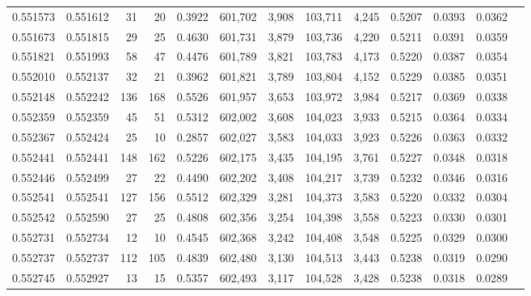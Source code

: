 \begin{tabular}{rrrrrrrrrrrrr}
0.551573 & 0.551612 &    31 &    20 &                                     0.3922 & 601,702 &   3,908 & 103,711 &   4,245 & 0.5207 & 0.0393 & 0.0362 \\
0.551673 & 0.551815 &    29 &    25 &                                     0.4630 & 601,731 &   3,879 & 103,736 &   4,220 & 0.5211 & 0.0391 & 0.0359 \\
0.551821 & 0.551993 &    58 &    47 &                                     0.4476 & 601,789 &   3,821 & 103,783 &   4,173 & 0.5220 & 0.0387 & 0.0354 \\
0.552010 & 0.552137 &    32 &    21 &                                     0.3962 & 601,821 &   3,789 & 103,804 &   4,152 & 0.5229 & 0.0385 & 0.0351 \\
0.552148 & 0.552242 &   136 &   168 &                                     0.5526 & 601,957 &   3,653 & 103,972 &   3,984 & 0.5217 & 0.0369 & 0.0338 \\
0.552359 & 0.552359 &    45 &    51 &                                     0.5312 & 602,002 &   3,608 & 104,023 &   3,933 & 0.5215 & 0.0364 & 0.0334 \\
0.552367 & 0.552424 &    25 &    10 &                                     0.2857 & 602,027 &   3,583 & 104,033 &   3,923 & 0.5226 & 0.0363 & 0.0332 \\
0.552441 & 0.552441 &   148 &   162 &                                     0.5226 & 602,175 &   3,435 & 104,195 &   3,761 & 0.5227 & 0.0348 & 0.0318 \\
0.552446 & 0.552499 &    27 &    22 &                                     0.4490 & 602,202 &   3,408 & 104,217 &   3,739 & 0.5232 & 0.0346 & 0.0316 \\
0.552541 & 0.552541 &   127 &   156 &                                     0.5512 & 602,329 &   3,281 & 104,373 &   3,583 & 0.5220 & 0.0332 & 0.0304 \\
0.552542 & 0.552590 &    27 &    25 &                                     0.4808 & 602,356 &   3,254 & 104,398 &   3,558 & 0.5223 & 0.0330 & 0.0301 \\
0.552731 & 0.552734 &    12 &    10 &                                     0.4545 & 602,368 &   3,242 & 104,408 &   3,548 & 0.5225 & 0.0329 & 0.0300 \\
0.552737 & 0.552737 &   112 &   105 &                                     0.4839 & 602,480 &   3,130 & 104,513 &   3,443 & 0.5238 & 0.0319 & 0.0290 \\
0.552745 & 0.552927 &    13 &    15 &                                     0.5357 & 602,493 &   3,117 & 104,528 &   3,428 & 0.5238 & 0.0318 & 0.0289 \\

\end{tabular}
